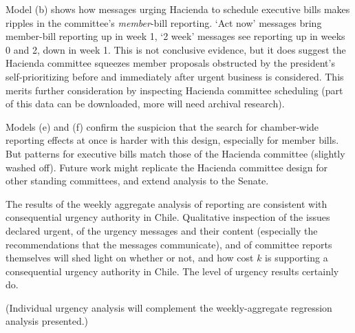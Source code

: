 \documentclass[letter,12pt]{article}
\begin{document}
Model (b) shows how messages urging Hacienda to schedule executive bills makes ripples in the committee's \emph{member}-bill reporting. `Act now' messages bring member-bill reporting up in week 1, `2 week' messages see reporting up in weeks 0 and 2, down in week 1. This is not conclusive evidence, but it does suggest the Hacienda committee squeezes member proposals obstructed by the president's self-prioritizing before and immediately after urgent business is considered. This merits further consideration by inspecting Hacienda committee scheduling (part of this data can be downloaded, more will need archival research).

Models (e) and (f) confirm the suspicion that the search for chamber-wide reporting effects at once is harder with this design, especially for member bills. But patterns for executive bills match those of the Hacienda committee (slightly washed off). Future work might replicate the Hacienda committee design for other standing committees, and extend analysis to the Senate. 

The results of the weekly aggregate analysis of reporting are consistent with consequential urgency authority in Chile. Qualitative inspection of the issues declared urgent, of the urgency messages and their content (especially the recommendations that the messages communicate), and of committee reports themselves will shed light on whether or not, and how cost $k$ is supporting a consequential urgency authority in Chile. The level of urgency results certainly do. 

(Individual urgency analysis will complement the weekly-aggregate regression analysis presented.)





\end{document}
